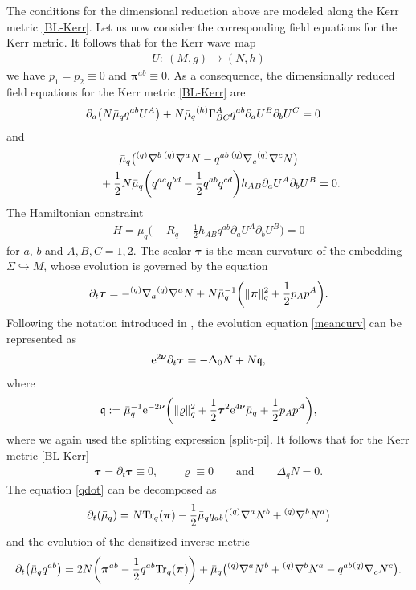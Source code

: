 \documentclass[pdftex]{sigma}
\def\ptl{\partial}%
\def\mbo#1{\boldsymbol{#1}}%
\def\grad{{\nabla}}%
\newcommand{\leftexp}[2]{{\vphantom{#2}}^{#1}{#2}}
\def\halb{\frac{1}{2}}%
\numberwithin{equation}{section}
\begin{document}
The conditions for the dimensional reduction above are modeled along the Kerr metric \eqref{BL-Kerr}.
Let us now consider the corresponding field equations for the Kerr metric. It follows that for the Kerr wave map
\begin{align*}
 U \colon\ (M, g) \to (N, h)
 \end{align*}
 we have $p_1= p_2 \equiv 0$
 and $ \mbo{\pi}^{ab} \equiv 0$. As a consequence, the dimensionally reduced field equations for the Kerr metric \eqref{BL-Kerr} are
 \begin{align}
 \ptl_a \bigl(N \bar{\mu}_q q^{ab} U^A\bigr) + N \bar{\mu}_q \leftexp{(h)}{\Gamma}^{A}_{BC} q^{ab} \ptl_a U^B \ptl_b U^C&{}=0 \label{Kerr-p-dot}
 \end{align}
and
\begin{gather*}
 \bar{\mu}_q \bigl(\leftexp{(q)}{\grad}^b \, \leftexp{(q)}{\grad}^a N - q^{ab} \, \leftexp{(q)}{\grad}_c \leftexp{(q)}{\grad}^c N \bigr) \notag\\
\qquad{} + \halb N \bar{\mu}_q \biggl(q^{ac} q^{bd} - \halb q^{ab} q^{cd}\biggr) h_{AB} \ptl_a U^A \ptl_b U^B=0.
\end{gather*}
The Hamiltonian constraint
\begin{align*}
H = \bar{\mu}_q \biggl(-R_q + \halb h_{AB} q^{ab} \ptl_a U^A \ptl_b U^B\biggr) =0
\end{align*}
for $a$, $b$ and $A, B, C = 1, 2$.
The scalar $\mbo{\tau}$ is the mean curvature of the embedding $\Sigma \hookrightarrow M$, whose evolution is governed by the equation
\begin{align}\label{meancurv}
\ptl_t \mbo{\tau} = - \leftexp{(q)}{\grad}_a \leftexp{(q)}{\grad}^a N + N \bar{\mu}^{-1}_q \biggl(\Vert \mbo{\pi} \Vert_q^2 + \halb p_A p^A\biggr).
\end{align}
Following the notation introduced in \cite{kaluz1}, the evolution equation \eqref{meancurv} can be represented as
\begin{align*}
{\rm e}^{2\mbo{\nu}} \ptl_t \mbo{\tau} = - \Delta_0 N + N \mathfrak{q},
\end{align*}
where
\begin{align*}
\mathfrak{q} := \bar{\mu}^{-1}_q {\rm e}^{-2\mbo{\nu}}\biggl(\Vert \varrho \Vert^2_q + \halb \mbo{\tau}^2 {\rm e}^{4\mbo{\nu}} \bar{\mu}_q + \halb p_A p^A \biggr),
\end{align*}
where we again used the splitting expression \eqref{split-pi}. It follows that for the Kerr metric \eqref{BL-Kerr}
\begin{align}
\mbo{\tau} = \ptl_t \mbo{\tau} \equiv 0, \qquad \varrho \equiv 0 \qquad \text{and} \qquad \Delta_q N =0. \label{kerr-maximal}
\end{align}
The equation \eqref{qdot} can be decomposed as
\[
\ptl_t (\bar{\mu}_q) = N {\rm Tr}_q (\mbo{\pi}) - \halb \bar{\mu}_q q_{ab}\bigl(\leftexp{(q)}{\grad}^a N^b + \leftexp{(q)}{\grad}^b N^a \bigr)
\]
and the evolution of the densitized inverse metric
\[
\ptl_t \bigl(\bar{\mu}_q q^{ab}\bigr) = 2 N \biggl(\mbo{\pi}^{ab} - \halb q^{ab} {\rm Tr}_q(\mbo{\pi})\biggr) + \bar{\mu}_q \bigl(\leftexp{(q)}{\grad}^a N^b + \leftexp{(q)}{\grad}^b N^a - q^{ab} \leftexp{(q)}{\grad}_c N^c \bigr).
\]
\end{document}
